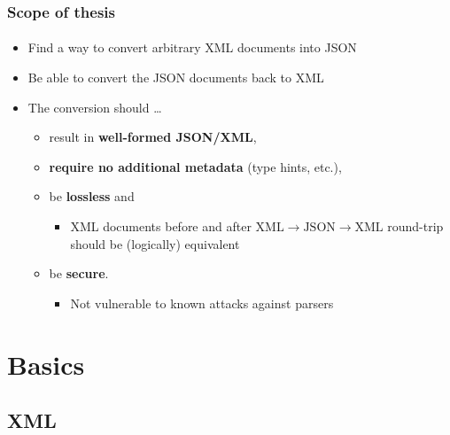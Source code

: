 \documentclass[
    alternativetitlepage=bild,
    cornerlogo=hgi_nds_logo2,
    sectionoverview,
]{rubpresentation}
\begin{document}
\begin{frame}[plain]
    \frametitle{Scope of thesis}
    \framesubtitle{}
    \begin{itemize}
        \item{} Find a way to convert arbitrary XML documents into JSON\\
        \item{} Be able to convert the JSON documents back to XML\\
        \item{} The conversion should \ldots\
            \begin{itemize}
                \item{} result in \textbf{well-formed JSON/XML},
                \item{} \textbf{require no additional metadata} (type hints, etc.),\\
                \item{} be \textbf{lossless} and
                    \begin{itemize}
                        \item{} XML documents before and after %
                                $\text{XML}\rightarrow\text{JSON}\rightarrow\text{XML}$ %
                                round-trip should be (logically) equivalent\\
                    \end{itemize}
                \item{} be \textbf{secure}.
                    \begin{itemize}
                        \item{} Not vulnerable to known attacks against parsers\\
                    \end{itemize}
            \end{itemize}
    \end{itemize}
\end{frame}


\section{Basics}

\subsection{XML}
\end{document}
